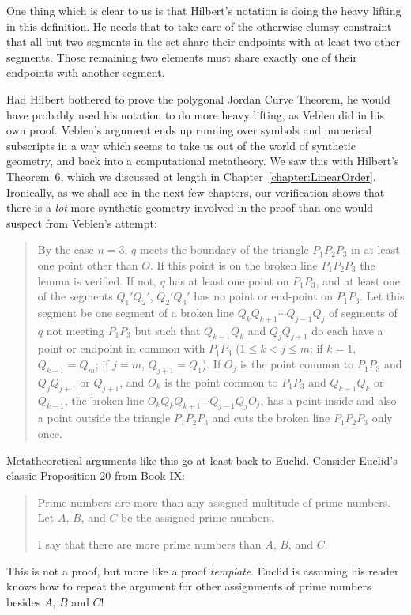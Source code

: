 One thing which is clear to us is that Hilbert's notation is doing the heavy lifting in this definition. He needs that to take care of the otherwise clumsy constraint that all but two segments in the set share their endpoints with at least two other segments. Those remaining two elements must share exactly one of their endpoints with another segment.

Had Hilbert bothered to prove the polygonal Jordan Curve Theorem, he would have probably used his notation to do more heavy lifting, as Veblen did in his own proof. Veblen's argument ends up running over symbols and numerical subscripts in a way which seems to take us out of the world of synthetic geometry, and back into a computational metatheory. We saw this with Hilbert's Theorem~6, which we discussed at length in Chapter~\ref{chapter:LinearOrder}. Ironically, as we shall see in the next few chapters, our verification shows that there is a \emph{lot} more synthetic geometry involved in the proof than one would suspect from Veblen's attempt:
\begin{quote}By the case $n=3$, $q$ meets the boundary of the triangle $P_1P_2P_3$ in at least one point other than $O$. If this point is on the broken line $P_1P_2P_3$ the lemma is verified. If not, $q$ has at least one point on $P_1P_3$, and at least one of the segments $Q_1'Q_2'$, $Q_2'Q_3'$ has no point or end-point on $P_1P_3$. Let this segment be one segment of a broken line $Q_kQ_{k+1}\cdots Q_{j-1}Q_j$ of segments of $q$ not meeting $P_1P_3$ but such that $Q_{k-1}Q_k$ and $Q_jQ_{j+1}$ do each have a point or endpoint in common with $P_1P_3$ ($1 \leq k < j \leq m$; if $k = 1$, $Q_{k-1} = Q_m$; if $j = m$, $Q_{j+1} = Q_1$). If $O_j$ is the point common to $P_1P_3$ and $Q_jQ_{j+1}$ or $Q_{j+1}$, and $O_k$ is the point common to $P_1P_3$ and $Q_{k-1}Q_k$ or $Q_{k-1}$, the broken line $O_kQ_kQ_{k+1}\cdots Q_{j-1}Q_jO_j$, has a point inside and also a point outside the triangle $P_1P_2P_3$ and cuts the broken line $P_1P_2P_3$ only once. \end{quote}

Metatheoretical arguments like this go at least back to Euclid. Consider Euclid's classic Proposition 20 from Book IX:
\begin{quote}
Prime numbers are more than any assigned multitude of prime numbers.
Let $A$, $B$, and $C$ be the assigned prime numbers.

I say that there are more prime numbers than $A$, $B$, and $C$.
\end{quote}
This is not a proof, but more like a proof \emph{template}. Euclid is assuming his reader knows how to repeat the argument for other assignments of prime numbers besides $A$, $B$ and $C$!

